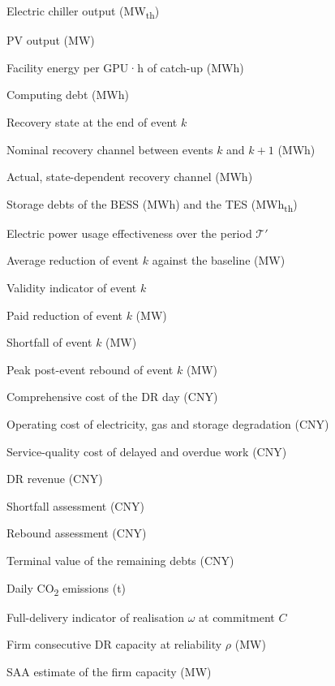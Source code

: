\documentclass[a4paper,twocolumn,fleqn,10pt]{article}
\begin{document}
{\begin{nomlist}
\item[{\(Q^{EC}_t\)}] Electric chiller output (MW\textsubscript{th})
\item[{\(P^{PV}_t\)}] PV output (MW)
\item[{\(\psi_t\)}] Facility energy per GPU·h of catch-up (MWh)
\item[{\(X_t\)}] Computing debt (MWh)
\item[{\(\mathbf x_{e_k}\)}] Recovery state at the end of event \(k\)
\item[{\(H_k\)}] Nominal recovery channel between events \(k\) and \(k+1\) (MWh)
\item[{\(H^{act}_k\)}] Actual, state-dependent recovery channel (MWh)
\item[{\(D^E_t\), \(D^S_t\)}] Storage debts of the BESS (MWh) and the TES (MWh\textsubscript{th})
\item[{\(\mathrm{PUE}(\mathcal T')\)}] Electric power usage effectiveness over the period \(\mathcal T'\)
\item[{\(\bar r_k\)}] Average reduction of event \(k\) against the baseline (MW)
\item[{\(z_k\)}] Validity indicator of event \(k\)
\item[{\(R_k\)}] Paid reduction of event \(k\) (MW)
\item[{\(s^{f}_k\)}] Shortfall of event \(k\) (MW)
\item[{\(\Delta P^{rb}_k\)}] Peak post-event rebound of event \(k\) (MW)
\item[{\(J\)}] Comprehensive cost of the DR day (CNY)
\item[{\(J^{op}\)}] Operating cost of electricity, gas and storage degradation (CNY)
\item[{\(J^{qos}\)}] Service-quality cost of delayed and overdue work (CNY)
\item[{\(J^{DR}\)}] DR revenue (CNY)
\item[{\(J^{sf}\)}] Shortfall assessment (CNY)
\item[{\(J^{rb}\)}] Rebound assessment (CNY)
\item[{\(J^{term}\)}] Terminal value of the remaining debts (CNY)
\item[{\(\mathrm{CO_2}\)}] Daily CO\textsubscript{2} emissions (t)
\item[{\(u_\omega(C)\)}] Full-delivery indicator of realisation \(\omega\) at commitment \(C\)
\item[{\(C^{firm}_\rho\)}] Firm consecutive DR capacity at reliability \(\rho\) (MW)
\item[{\(\hat C^{firm}_\rho\)}] SAA estimate of the firm capacity (MW)

\end{nomlist}}
\end{document}
